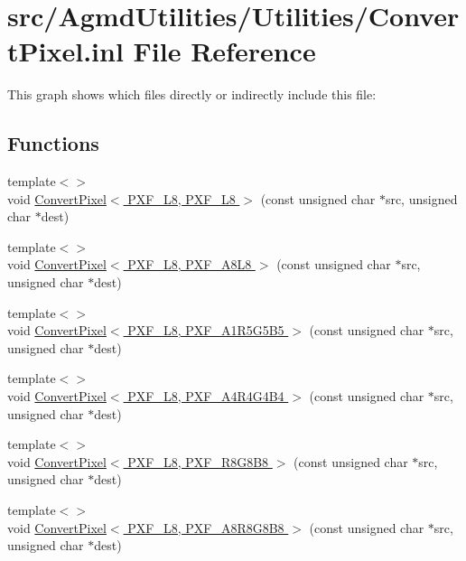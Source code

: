 \hypertarget{_convert_pixel_8inl}{\section{src/\+Agmd\+Utilities/\+Utilities/\+Convert\+Pixel.inl File Reference}
\label{_convert_pixel_8inl}
}
This graph shows which files directly or indirectly include this file\+:
\subsection*{Functions}
\begin{DoxyCompactItemize}
\item 
{\footnotesize template$<$$>$ }\\void \hyperlink{_convert_pixel_8inl_afc29fce01775bb6e56912219e0ee3d3d}{Convert\+Pixel$<$ P\+X\+F\+\_\+\+L8, P\+X\+F\+\_\+\+L8 $>$} (const unsigned char $\ast$src, unsigned char $\ast$dest)
\item 
{\footnotesize template$<$$>$ }\\void \hyperlink{_convert_pixel_8inl_a24fabc100db5b6d2adf23050e4925827}{Convert\+Pixel$<$ P\+X\+F\+\_\+\+L8, P\+X\+F\+\_\+\+A8\+L8 $>$} (const unsigned char $\ast$src, unsigned char $\ast$dest)
\item 
{\footnotesize template$<$$>$ }\\void \hyperlink{_convert_pixel_8inl_af4c07bfc491c3977a5894a734156a59e}{Convert\+Pixel$<$ P\+X\+F\+\_\+\+L8, P\+X\+F\+\_\+\+A1\+R5\+G5\+B5 $>$} (const unsigned char $\ast$src, unsigned char $\ast$dest)
\item 
{\footnotesize template$<$$>$ }\\void \hyperlink{_convert_pixel_8inl_a583b9f9a0fa5a68dcad97f0d4c24c967}{Convert\+Pixel$<$ P\+X\+F\+\_\+\+L8, P\+X\+F\+\_\+\+A4\+R4\+G4\+B4 $>$} (const unsigned char $\ast$src, unsigned char $\ast$dest)
\item 
{\footnotesize template$<$$>$ }\\void \hyperlink{_convert_pixel_8inl_ac52d7adba712bb533ae95d42428b9bf5}{Convert\+Pixel$<$ P\+X\+F\+\_\+\+L8, P\+X\+F\+\_\+\+R8\+G8\+B8 $>$} (const unsigned char $\ast$src, unsigned char $\ast$dest)
\item 
{\footnotesize template$<$$>$ }\\void \hyperlink{_convert_pixel_8inl_a6a0287d0bb3e226c7eac450edd827570}{Convert\+Pixel$<$ P\+X\+F\+\_\+\+L8, P\+X\+F\+\_\+\+A8\+R8\+G8\+B8 $>$} (const unsigned char $\ast$src, unsigned char $\ast$dest)

\end{DoxyCompactItemize}
